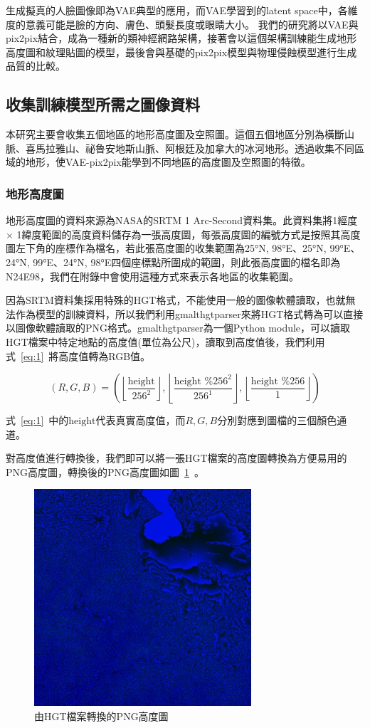 \documentclass[a4paper, 12pt]{article}
\begin{document}
生成擬真的人臉圖像即為VAE典型的應用，而VAE學習到的latent space中，各維度的意義可能是臉的方向、膚色、頭髮長度或眼睛大小。
我們的研究將以VAE與pix2pix結合，成為一種新的類神經網路架構，接著會以這個架構訓練能生成地形高度圖和紋理貼圖的模型，最後會與基礎的pix2pix模型與物理侵蝕模型進行生成品質的比較。

\subsection{收集訓練模型所需之圖像資料}
本研究主要會收集五個地區的地形高度圖及空照圖。這個五個地區分別為橫斷山脈、喜馬拉雅山、祕魯安地斯山脈、阿根廷及加拿大的冰河地形。透過收集不同區域的地形，使VAE-pix2pix能學到不同地區的高度圖及空照圖的特徵。
\subsubsection{地形高度圖}
地形高度圖的資料來源為NASA的SRTM 1 Arc-Second資料集\cite{srtm1arc}。此資料集將1經度 $\times$ 1緯度範圍的高度資料儲存為一張高度圖，每張高度圖的編號方式是按照其高度圖左下角的座標作為檔名，若此張高度圖的收集範圍為25°N, 98°E、25°N, 99°E、24°N, 99°E、24°N, 98°E四個座標點所圍成的範圍，則此張高度圖的檔名即為N24E98，我們在附錄中會使用這種方式來表示各地區的收集範圍。

因為SRTM資料集採用特殊的HGT格式，不能使用一般的圖像軟體讀取，也就無法作為模型的訓練資料，所以我們利用gmalthgtparser來將HGT格式轉為可以直接以圖像軟體讀取的PNG格式。gmalthgtparser為一個Python module，可以讀取HGT檔案中特定地點的高度值(單位為公尺)，讀取到高度值後，我們利用式~\ref{eq:1}~將高度值轉為RGB值。

\begin{equation}
    (R, G, B)=\left(\left\lfloor\frac{\text {height}}{256^{2}}\right\rfloor,\left\lfloor\frac{\text {height } \% 256^{2}}{256^{1}}\right\rfloor,\left\lfloor\frac{\text {height } \% 256}{1}\right\rfloor\right)
    \label{eq:1}
\end{equation}

式~\ref{eq:1}~中的$\text{height}$代表真實高度值，而$R,G,B$分別對應到圖檔的三個顏色通道。

對高度值進行轉換後，我們即可以將一張HGT檔案的高度圖轉換為方便易用的PNG高度圖，轉換後的PNG高度圖如圖~\ref{fig:5}~。

\begin{figure}[htbp]
    \centering
    \includegraphics[width=0.45\linewidth]{fig/5.jpg}
    \caption{由HGT檔案轉換的PNG高度圖}
    \label{fig:5}
\end{figure}
\end{document}
